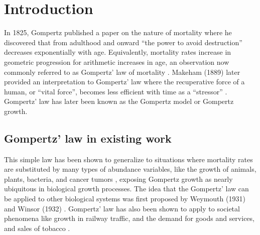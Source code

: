 \documentclass{article}
\begin{document}
\section{Introduction}

In 1825, Gompertz published a paper on the nature of mortality where he discovered that from adulthood and onward ``the power to avoid destruction'' decreases exponentially with age. Equivalently, mortality rates increase in geometric progression for arithmetic increases in age, an observation now commonly referred to as Gompertz' law of mortality \cite{Gompertz1825}. Makeham (1889) later provided an interpretation to Gompertz' law where the recuperative force of a human, or ``vital force'', becomes less efficient with time as a ``stressor'' \cite{makeham1889further}. Gompertz' law has later been known as the Gompertz model or Gompertz growth. 

\subsection{Gompertz' law in existing work}
This simple law has been shown to generalize to situations where mortality rates are substituted by many types of abundance variables, like the growth of animals, plants, bacteria, and cancer tumors \cite{weymouth1931relative,weymouth1931age,laird1964dynamics,zwietering1990modeling,skinner1994mathematical,starck1998avian,aggrey2002comparison,paine2012fit,benzekry2014classical,halmi2014evaluation,tjorve2010shapes}, exposing Gompertz growth as nearly ubiquitous in biological growth processes. The idea that the Gompertz' law can be applied to other biological systems was first proposed by Weymouth (1931) \cite{weymouth1931relative,weymouth1931age} and Winsor (1932) \cite{Winsor1932}. Gompertz' law has also been shown to apply to societal phenomena like growth in railway traffic, and the demand for goods and services, and sales of tobacco \cite{olshansky1997ever,prescott1922law,peabody1924growth}.
\end{document}
